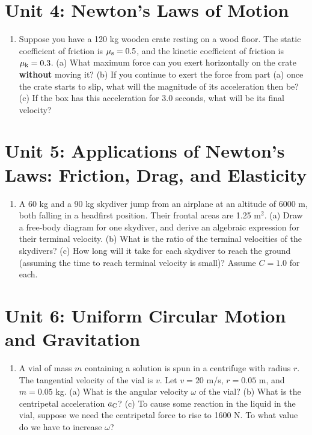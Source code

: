 \documentclass[10pt]{article}
\begin{document}
\section{Unit 4: Newton's Laws of Motion}
\begin{enumerate}
\item Suppose you have a 120 kg wooden crate resting on a wood floor.  The static coefficient of friction is $\mu_{\rm s} = 0.5$, and the kinetic coefficient of friction is $\mu_{\rm k} = 0.3$.  (a) What maximum force can you exert horizontally on the crate \textbf{without} moving it?  (b) If you continue to exert the force from part (a) once the crate starts to slip, what will the magnitude of its acceleration then be?  (c) If the box has this acceleration for 3.0 seconds, what will be its final velocity? \\ \vspace{3cm}
\end{enumerate}

\section{Unit 5: Applications  of Newton's Laws: Friction, Drag, and Elasticity}
\begin{enumerate}
\item A 60 kg and a 90 kg skydiver jump from an airplane at an altitude of 6000 m, both falling in a headfirst position.  Their frontal areas are 1.25 m$^2$.  (a) Draw a free-body diagram for one skydiver, and derive an algebraic expression for their terminal velocity.  (b) What is the ratio of the terminal velocities of the skydivers?  (c) How long will it take for each skydiver to reach the ground (assuming the time to reach terminal velocity is small)?  Assume $C = 1.0$ for each. \\ \vspace{2.75cm}
\end{enumerate}

\section{Unit 6: Uniform Circular Motion and Gravitation}
\begin{enumerate}
\item A vial of mass $m$ containing a solution is spun in a centrifuge with radius $r$.  The tangential velocity of the vial is $v$.  Let $v = 20$ m/s, $r = 0.05$ m, and $m = 0.05$ kg. (a) What is the angular velocity $\omega$ of the vial? (b) What is the centripetal acceleration $a_{\rm C}$?  (c) To cause some reaction in the liquid in the vial, suppose we need the centripetal force to rise to 1600 N.  To what value do we have to increase $\omega$? \\ \vspace{3cm}
\end{enumerate}
\end{document}
